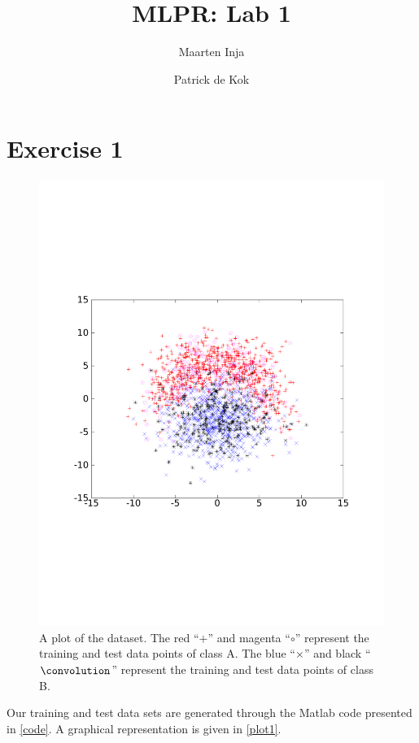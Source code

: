 \documentclass[a4paper,11pt]{article}
\author{Maarten Inja \and Patrick de Kok}
\title{MLPR: Lab 1}
\begin{document}
\maketitle

\section*{Exercise 1}
\begin{figure}[h]
  \caption{A plot of the dataset.  The red ``$+$'' and magenta ``$\circ$'' represent the training and test data points of class A.  The blue ``$\times$'' and black ``$\convolution$'' represent the training and test data points of class B.}
  \label{plot1}
  \begin{center}
    \includegraphics[width=0.6\paperwidth]{plot1}
  \end{center}
\end{figure}

Our training and test data sets are generated through the Matlab code presented in \autoref{code}.  A graphical representation is given in \autoref{plot1}.
\end{document}
